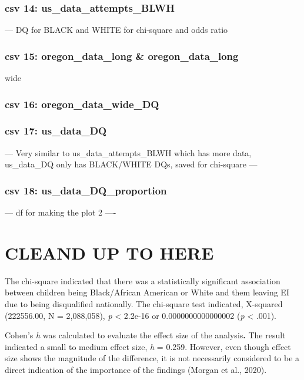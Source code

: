 \documentclass[
  letterpaper,
  DIV=11,
  numbers=noendperiod]{scrartcl}
\begin{document}
\subsubsection{csv 14:
us\_data\_attempts\_BLWH}\label{csv-14-us_data_attempts_blwh}

--- DQ for BLACK and WHITE for chi-square and odds ratio

\subsubsection{csv 15: oregon\_data\_long \&
oregon\_data\_long}\label{csv-15-oregon_data_long-oregon_data_long}

wide

\subsubsection{csv 16:
oregon\_data\_wide\_DQ}\label{csv-16-oregon_data_wide_dq}

\subsubsection{csv 17: us\_data\_DQ}\label{csv-17-us_data_dq}

--- Very similar to us\_data\_attempts\_BLWH which has more data,
us\_data\_DQ only has BLACK/WHITE DQs, saved for chi-square ---

\subsubsection{csv 18:
us\_data\_DQ\_proportion}\label{csv-18-us_data_dq_proportion}

--- df for making the plot 2 ----

\section{CLEAND UP TO HERE}\label{cleand-up-to-here}

The chi-square indicated that there was a statistically significant
association between children being Black/African American or White and
them leaving EI due to being disqualified nationally. The chi-square
test indicated, X-squared (222556.00, N = 2,088,058), \emph{p}
\textless{} 2.2e-16 or 0.0000000000000002 (\emph{p} \textless{} .001).

Cohen's \emph{h} was calculated to evaluate the effect size of the
analysis\textbf{.} The result indicated a small to medium effect size,
\emph{h} = 0.259. However, even though effect size shows the magnitude
of the difference, it is not necessarily considered to be a direct
indication of the importance of the findings (Morgan et al., 2020).
\end{document}
